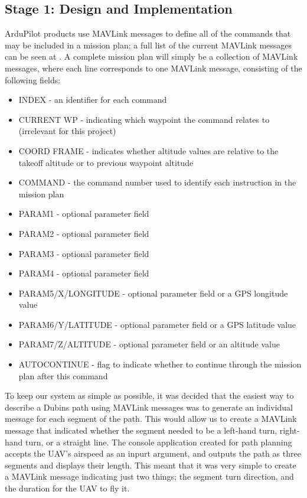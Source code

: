 \subsection{Stage 1: Design and Implementation}
\label{task2:stage1:design}

ArduPilot products use MAVLink messages to define all of the commands that may be included in a mission plan; a full list of the current MAVLink messages can be seen at \cite{MavlinkMessages}. A complete mission plan will simply be a collection of MAVLink messages, where each line corresponds to one MAVLink message, consisting of the following fields:

\begin{itemize}
	\item INDEX - an identifier for each command
	\item CURRENT WP - indicating which waypoint the command relates to (irrelevant for this project)
	\item COORD FRAME - indicates whether altitude values are relative to the takeoff altitude or to previous waypoint altitude
	\item COMMAND - the command number used to identify each instruction in the mission plan
	\item PARAM1 - optional parameter field
	\item PARAM2 - optional parameter field
	\item PARAM3 - optional parameter field
	\item PARAM4 - optional parameter field
	\item PARAM5/X/LONGITUDE - optional parameter field or a GPS longitude value 
	\item PARAM6/Y/LATITUDE - optional parameter field or a GPS latitude value
	\item PARAM7/Z/ALTITUDE - optional parameter field or an altitude value
	\item AUTOCONTINUE - flag to indicate whether to continue through the mission plan after this command
\end{itemize}

 To keep our system as simple as possible, it was decided that the easiest way to describe a Dubins path using MAVLink messages was to generate an individual message for each segment of the path. This would allow us to create a MAVLink message that indicated whether the segment needed to be a left-hand turn, right-hand turn, or a straight line. The console application created for path planning accepts the UAV's airspeed as an inpurt argument, and outputs the path as three segments and displays their length. This meant that it was very simple to create a MAVLink message indicating just two things; the segment turn direction, and the duration for the UAV to fly it. 

